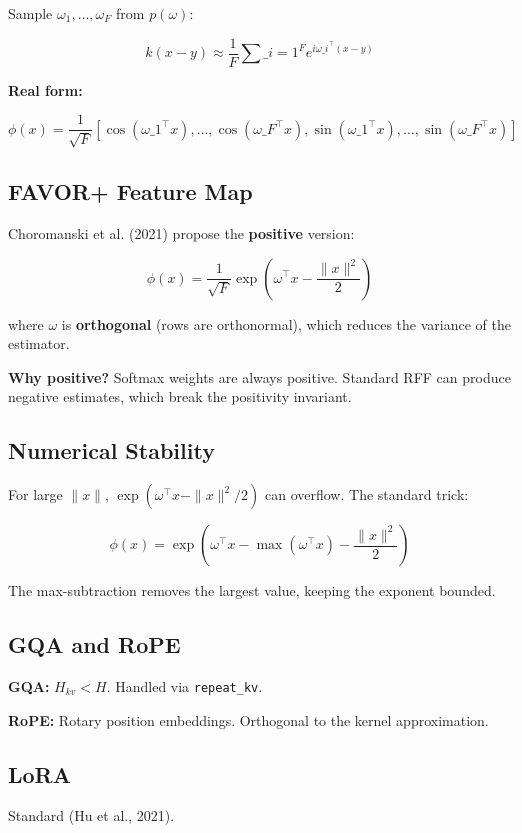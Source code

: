 Sample $\omega_1, \dots, \omega_F$ from $p(\omega)$:

\[
k(x - y) \approx \frac{1}{F} \sum\_{i=1}^{F} e^{i \omega\_i^\top (x - y)}
\tag{3.5}
\]

\textbf{Real form:}

\[
\phi(x) = \frac{1}{\sqrt{F}} [\cos(\omega\_1^\top x), \dots, \cos(\omega\_F^\top x), \sin(\omega\_1^\top x), \dots, \sin(\omega\_F^\top x)]
\tag{3.6}
\]

\subsection{FAVOR+ Feature Map}

Choromanski et al. (2021) propose the \textbf{positive} version:

\[
\phi(x) = \frac{1}{\sqrt{F}} \exp\!\left(\omega^\top x - \frac{\|x\|^2}{2}\right)
\tag{3.7}
\]

where $\omega$ is \textbf{orthogonal} (rows are orthonormal), which reduces the 
variance of the estimator.

\textbf{Why positive?} Softmax weights are always positive. Standard RFF can 
produce negative estimates, which break the positivity invariant.

\subsection{Numerical Stability}

For large $\|x\|$, $\exp(\omega^\top x - \|x\|^2/2)$ can overflow. The 
standard trick:

\[
\phi(x) = \exp\!\left(\omega^\top x - \max(\omega^\top x) - \frac{\|x\|^2}{2}\right)
\tag{3.8}
\]

The max-subtraction removes the largest value, keeping the exponent 
bounded.

\subsection{GQA and RoPE}

\textbf{GQA:} $H_{kv} < H$. Handled via \texttt{repeat\_kv}.

\textbf{RoPE:} Rotary position embeddings. Orthogonal to the kernel 
approximation.

\subsection{LoRA}

Standard (Hu et al., 2021).

